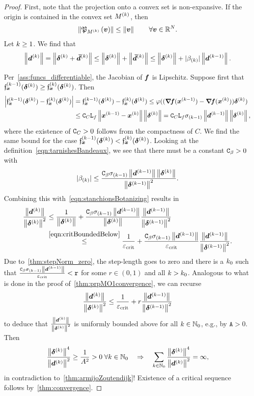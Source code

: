 \documentclass{article}
\theoremstyle{plain}
\theoremstyle{definition}
\begin{document}
\begin{proof}
	First, note that the projection onto a convex set is non-expansive.
	If the origin is contained in the convex set $M\KK$,
	then
	$$
	\norm{\proj{\ve v}{M\KK}} \leq \norm{\ve v}
	\qquad \forall \ve{v}\in \RRin.
	$$
	Let $\kk \geq 1$. We find that
	\begin{equation}	
	\norm{\vdK}
	=
	\norm{\sdK + \ve{\bar{\vd}}\KK}
	\leq
	\norm{\sdK} + 
	\norm{\ve{\bar{\vd}}\KK}
	\leq
	\norm{\sdK} + 
	|\beta\kK|
	\norm{\vd\KKp}.
	\label{eqn:stanchionsBotanizing}
	\end{equation}

	Per~\cref{ass:funcs_differentiable}, the Jacobian of $\vf$
	is Lipschitz.
	Suppose first that $\funcXKp(\sdK) \geq \funcXK(\sdK)$.
	Then
	\begin{align*}
	\left|\funcXKp(\sdK) - \funcXK(\sdK)\right|
	&=
	{\funcXKp(\sdK) - \funcXK(\sdK)}
	\leq
	\phiC((\jacf(\vxKp) - \jacf(\vxK))\sdK)
	\\
	&\leq
	\Const_C \lipConstf \norm{\vxKp - \vxK} \norm{\sdK}
	=
	\Const_C \lipConstf \szKp \norm{\vdKp}\norm{\sdK},
	\end{align*}
	where the existence of $\Const_C>0$ follows from the 
	compactness of $C$.
	We find the same bound for the case $\funcXKp(\sdK) < \funcXK(\sdK)$.
	Looking at the definition~\eqref{eqn:tarnishesBandeaux}, 
	we see that there must be a constant $\Const_\beta > 0$ with
	$$
	|\beta\kK|
	\leq
	\frac{\Const_\beta
	\szKp \norm{\vdKp}\norm{\sdK}}
	{
		\norm{\sdKp}^2
	}.
	$$
	Combining this with~\eqref{eqn:stanchionsBotanizing} results in
	\begin{align}
		\frac{\norm{\vdK}}{\norm{\sdK}^2}
		&\leq
		\frac{1}{\norm{\sdK}}
		+
		\frac{
			\Const_\beta
			\szKp \norm{\vdKp}
		}{
			\norm{\sdK}
		}
		\frac{\norm{\vdKp}}{\norm{\sdKp}^2}
		\nonumber
		\\
		&\stackrel{\eqref{eqn:critBoundedBelow}}\leq
		\frac{1}{\critBound}
		+
		\frac{
			\Const_\beta
			\szKp \norm{\vdKp}
		}{
			\critBound
		}
		\frac{\norm{\vdKp}}{\norm{\sdKp}^2}
		.
		\label{eqn:pardiSubvocalisation}
	\end{align}
	Due to~\cref{thm:stepNorm_zero},
	the step-length goes to zero and there is a $\kk_0$ such that
	$\frac{
			\Const_\beta
			\szKp \norm{\vdKp}
		}{
			\critBound
		}<\mathtt{r}$
	for some $r\in (0,1)$ and all $\kk>\kk_0$.
	Analogous to what is done in the proof of~\cref{thm:prpMO1convergence},
	we can recurse
	$$
	\frac{\norm{\vdK}}{\norm{\sdK}^2}
	\leq
	\frac{1}{\critBound}
	+
	r
	\frac{\norm{\vdKp}}{\norm{\sdKp}^2}
	$$ 
	to deduce that $\frac{\norm{\vdK}}{\norm{\sdK}^2}$
	is uniformly bounded above for all $\kk\in\NN_0$,
	e.g., by $\mathtt A > 0$.
	Then
	$$
	\frac{\norm{\sdK}^4}{\norm{\vdK}^2}
	\geq \frac{1}{A^2} > 0
	\; \forall \kk \in \NN_0
	\quad\Rightarrow\quad
	\sum_{\kk\in\NN_0}
	\frac{\norm{\sdK}^4}{\norm{\vdK}^2}
	= 
	\infty,
	$$
	in contradiction to~\cref{thm:armijoZoutendijk}!
	Existence of a critical sequence follows by~\cref{thm:convergence}.
\end{proof}


\end{document}
